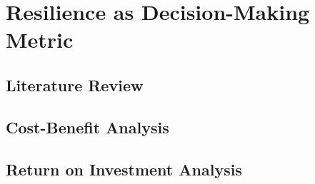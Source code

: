 
\renewcommand{\thechapter}{6}

\chapter{Resilience as Decision-Making Metric}

\section{Literature Review}

\section{Cost-Benefit Analysis}

\section{Return on Investment Analysis}
